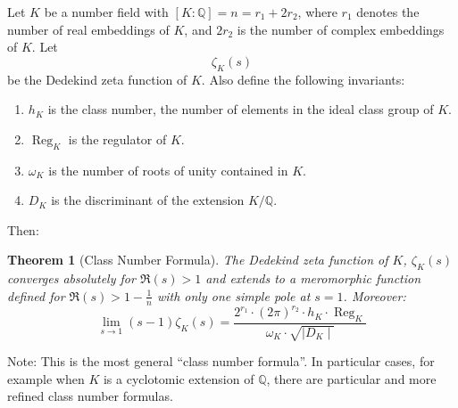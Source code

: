\documentclass[12pt]{article}
\newtheorem{thm}{Theorem}
\newcommand{\Rats}{\mathbb{Q}}
\begin{document}
Let $K$ be a number field with $[K:\Rats]=n=r_1+2r_2$, where $r_1$
denotes the number of real embeddings of $K$, and $2r_2$ is the
number of complex embeddings of $K$. Let
$$\zeta_K(s)$$
be the Dedekind zeta function of $K$. Also define the following
invariants:
\begin{enumerate}
\item $h_K$ is the class number, the number of elements in the
ideal class group of $K$.

\item $\operatorname{Reg}_K$ is the regulator of $K$.

\item $\omega_K$ is the number of roots of unity contained in $K$.

\item $D_K$ is the discriminant of the extension $K/\Rats$.
\end{enumerate}

Then:

\begin{thm}[Class Number Formula]
The Dedekind zeta function of $K$, $\zeta_K(s)$ converges
absolutely for $\Re(s)>1$ and extends to a meromorphic function
defined for $\Re(s)>1-\frac{1}{n}$ with only one simple pole at
$s=1$. Moreover:
$$\lim_{s\to 1}
(s-1)\zeta_K(s)=\frac{2^{r_1}\cdot(2\pi)^{r_2}\cdot h_K\cdot
\operatorname{Reg}_K}{\omega_K \cdot \sqrt{\mid D_K \mid}}$$
\end{thm}

Note: This is the most general ``class number formula''. In
particular cases, for example when $K$ is a cyclotomic extension
of $\Rats$, there are particular and more refined class number formulas.
\end{document}
